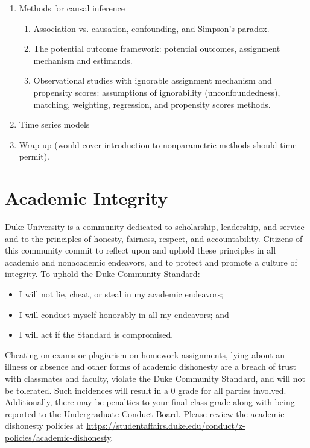 \documentclass[11pt, a4paper]{article}
\begin{document}
\begin{enumerate}[label= {\color{darkblue}{\ArrowBoldRightStrobe}}]
\begin{enumerate}[label= {\color{cyan}{\Rectangle}}]
	\end{enumerate}
	\item Methods for causal inference
	\begin{enumerate}[label= {\color{cyan}{\Rectangle}}]
		\item Association vs. causation, confounding, and Simpson's paradox.
		\item The potential outcome framework: potential outcomes, assignment mechanism and estimands.
		\item Observational studies with ignorable assignment mechanism and propensity scores: assumptions of ignorability (unconfoundedness), matching, weighting, regression, and propensity scores methods. 
	\end{enumerate}
	\item Time series models
	\item Wrap up (would cover introduction to nonparametric methods should time permit).
\end{enumerate}


\section{Academic Integrity}  
Duke University is a community dedicated to scholarship, leadership, and service and to the principles of honesty, fairness, respect, and accountability. Citizens of this community commit to reflect upon and uphold these principles in all academic and nonacademic endeavors, and to protect and promote a culture of integrity. To uphold the \href{https://studentaffairs.duke.edu/conduct/about-us/duke-community-standard}{Duke Community Standard}:
\begin{itemize}[label= {\color{darkred}{\Large \HandRight}}]
	\item I will not lie, cheat, or steal in my academic endeavors;
	\item I will conduct myself honorably in all my endeavors; and
	\item I will act if the Standard is compromised.
\end{itemize}

Cheating on exams or plagiarism on homework assignments, lying about an illness or absence and other forms of academic dishonesty are a breach of trust with classmates and faculty, violate the Duke Community Standard, and will not be tolerated. Such incidences will result in a 0 grade for all parties involved. Additionally, there may be penalties to your final class grade along with being reported to the Undergraduate Conduct Board. Please review the academic dishonesty policies at \url{https://studentaffairs.duke.edu/conduct/z-policies/academic-dishonesty}.
\end{document}
